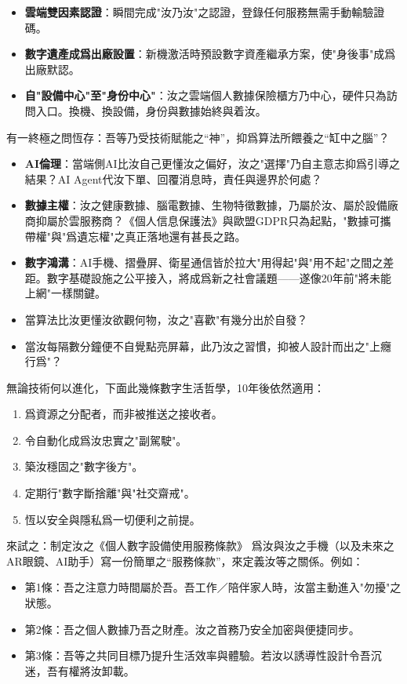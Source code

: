 \begin{itemize}
  \item \textbf{雲端雙因素認證}：瞬間完成"汝乃汝"之認證，登錄任何服務無需手動輸驗證碼。
  \item \textbf{數字遺產成爲出廠設置}：新機激活時預設數字資產繼承方案，使"身後事"成爲出廠默認。
  \item \textbf{自"設備中心"至"身份中心"}：汝之雲端個人數據保險櫃方乃中心，硬件只為訪問入口。換機、換設備，身份與數據始終與着汝。
\end{itemize}


有一終極之問恆存：吾等乃受技術賦能之“神”，抑爲算法所餵養之“缸中之腦”？

\begin{itemize}
  \item \textbf{AI倫理}：當端側AI比汝自己更懂汝之偏好，汝之"選擇"乃自主意志抑爲引導之結果？AI Agent代汝下單、回覆消息時，責任與邊界於何處？
  \item \textbf{數據主權}：汝之健康數據、腦電數據、生物特徵數據，乃屬於汝、屬於設備廠商抑屬於雲服務商？《個人信息保護法》與歐盟GDPR只為起點，"數據可攜帶權"與"爲遺忘權"之真正落地還有甚長之路。
  \item \textbf{數字鴻溝}：AI手機、摺疊屏、衛星通信皆於拉大"用得起"與"用不起"之間之差距。數字基礎設施之公平接入，將成爲新之社會議題——遂像20年前"將未能上網"一樣關鍵。
  \item 當算法比汝更懂汝欲觀何物，汝之"喜歡"有幾分出於自發？
  \item 當汝每隔數分鐘便不自覺點亮屏幕，此乃汝之習慣，抑被人設計而出之"上癮行爲"？
\end{itemize}


無論技術何以進化，下面此幾條數字生活哲學，10年後依然適用：

\begin{enumerate}
  \item 爲資源之分配者，而非被推送之接收者。
  \item 令自動化成爲汝忠實之"副駕駛"。
  \item 築汝穩固之"數字後方"。
  \item 定期行"數字斷捨離"與"社交齋戒"。
  \item 恆以安全與隱私爲一切便利之前提。
\end{enumerate}

\begin{tcbpractice}{來試之：制定汝之《個人數字設備使用服務條款》}
爲汝與汝之手機（以及未來之AR眼鏡、AI助手）寫一份簡單之“服務條款”，來定義汝等之關係。例如：

\begin{itemize}
  \item 第1條：吾之注意力時間屬於吾。吾工作／陪伴家人時，汝當主動進入"勿擾"之狀態。
  \item 第2條：吾之個人數據乃吾之財產。汝之首務乃安全加密與便捷同步。
  \item 第3條：吾等之共同目標乃提升生活效率與體驗。若汝以誘導性設計令吾沉迷，吾有權將汝卸載。
\end{itemize}

\end{tcbpractice}

